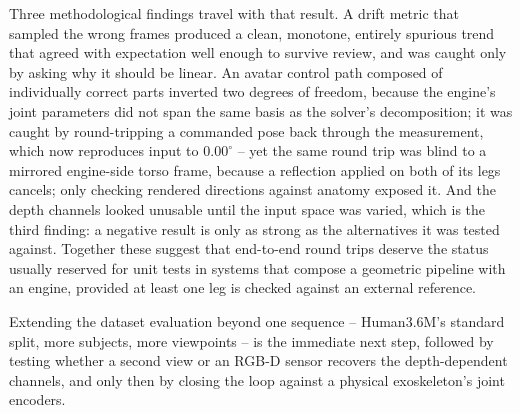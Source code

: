 \documentclass[conference]{IEEEtran}
\begin{document}
Three methodological findings travel with that result. A drift metric that
sampled the wrong frames produced a clean, monotone, entirely spurious
trend that agreed with expectation well enough to survive review, and was
caught only by asking why it should be linear. An avatar control path
composed of individually correct parts inverted two degrees of freedom,
because the engine's joint parameters did not span the same basis as the
solver's decomposition; it was caught by round-tripping a commanded pose
back through the measurement, which now reproduces input to
$0.00^\circ$ -- yet the same round trip was blind to a mirrored
engine-side torso frame, because a reflection applied on both of its legs
cancels; only checking rendered directions against anatomy exposed it.
And the depth channels looked unusable until the input space was varied,
which is the third finding: a negative result is only as strong as the
alternatives it was tested against. Together these suggest that
end-to-end round trips deserve the status usually reserved for unit tests
in systems that compose a geometric pipeline with an engine, provided at
least one leg is checked against an external reference.

Extending the dataset evaluation beyond one sequence -- Human3.6M's
standard split, more subjects, more viewpoints -- is the immediate next
step, followed by testing whether a second view or an RGB-D sensor
recovers the depth-dependent channels, and only then by closing the loop
against a physical exoskeleton's joint encoders.
\end{document}
